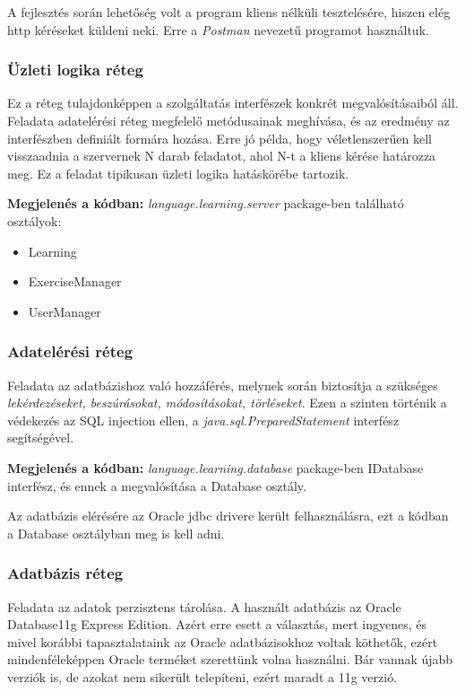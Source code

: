 \documentclass[11pt, a4paper]{article}
\begin{document}
    A fejlesztés során lehetőség volt a program kliens nélküli tesztelésére, hiszen elég http kéréseket küldeni neki. Erre a \textit{Postman} nevezetű programot használtuk.
    
    \subsubsection{Üzleti logika réteg}
    Ez a réteg tulajdonképpen a szolgáltatás interfészek konkrét megvalósításaiból áll. Feladata adatelérési réteg megfelelő metódusainak meghívása, és az eredmény az interfészben definiált formára hozása. Erre jó példa, hogy véletlenszerűen kell visszaadnia a szervernek N darab feladatot, ahol N-t a kliens kérése határozza meg. Ez a feladat tipikusan üzleti logika hatáskörébe tartozik.
    
    \textbf{Megjelenés a kódban:} \textit{language.learning.server} package-ben található osztályok: 
    \begin{itemize}
    	\item Learning
    	\item ExerciseManager
    	\item UserManager
    \end{itemize}
    
    \subsubsection{Adatelérési réteg}
    Feladata az adatbázishoz való hozzáférés, melynek során biztosítja a szükséges \textit{lekérdezéseket, beszúrásokat, módosításokat, törléseket}. Ezen a szinten történik a védekezés az SQL injection ellen, a \textit{java.sql.PreparedStatement} interfész segítségével.
    
    \textbf{Megjelenés a kódban:} \textit{language.learning.database} package-ben IDatabase interfész, és ennek a megvalósítása a Database osztály.
    
    Az adatbázis elérésére az Oracle jdbc drivere került felhasználásra, ezt a kódban a Database osztályban meg is kell adni.
    
    \subsubsection{Adatbázis réteg}
    Feladata az adatok perzisztens tárolása. A használt adatbázis az Oracle Database11g Express Edition. Azért erre esett a választás, mert ingyenes, és mivel korábbi tapasztalataink az Oracle adatbázisokhoz voltak köthetők, ezért mindenféleképpen Oracle terméket szerettünk volna használni. Bár vannak újabb verziók is, de azokat nem sikerült telepíteni, ezért maradt a 11g verzió.
    
\end{document}
